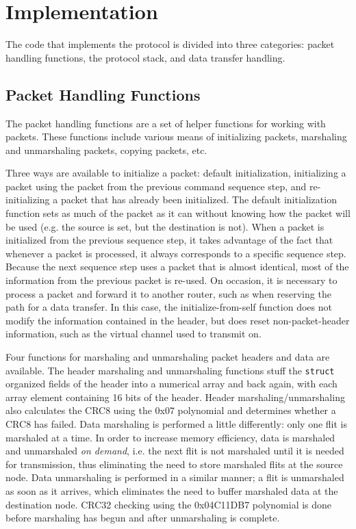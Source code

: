 \section{Implementation}\label{sec:protocol:implementation}

The code that implements the protocol is divided into three categories: packet handling functions, the protocol stack, and data transfer handling.

\subsection{Packet Handling Functions}\label{sec:protocol:implementation:packet_handling}

The packet handling functions are a set of helper functions for working with packets. These functions include various means of initializing packets, marshaling and unmarshaling packets, copying packets, etc.

Three ways are available to initialize a packet: default initialization, initializing a packet using the packet from the previous command sequence step, and re-initializing a packet that has already been initialized. The default initialization function sets as much of the packet as it can without knowing how the packet will be used (e.g. the source is set, but the destination is not). When a packet is initialized from the previous sequence step, it takes advantage of the fact that whenever a packet is processed, it always corresponds to a specific sequence step. Because the next sequence step uses a packet that is almost identical, most of the information from the previous packet is re-used. On occasion, it is necessary to process a packet and forward it to another router, such as when reserving the path for a data transfer. In this case, the initialize-from-self function does not modify the information contained in the header, but does reset non-packet-header information, such as the virtual channel used to transmit on.

Four functions for marshaling and unmarshaling packet headers and data are available. The header marshaling and unmarshaling functions stuff the \lstinline$struct$ organized fields of the header into a numerical array and back again, with each array element containing 16 bits of the header. Header marshaling/unmarshaling also calculates the CRC8 using the 0x07 polynomial and determines whether a CRC8 has failed. Data marshaling is performed a little differently: only one flit is marshaled at a time. In order to increase memory efficiency, data is marshaled and unmarshaled \emph{on demand}, i.e. the next flit is not marshaled until it is needed for transmission, thus eliminating the need to store marshaled flits at the source node. Data unmarshaling is performed in a similar manner; a flit is unmarshaled as soon as it arrives, which eliminates the need to buffer marshaled data at the destination node. CRC32 checking using the 0x04C11DB7 polynomial is done before marshaling has begun and after unmarshaling is complete.

